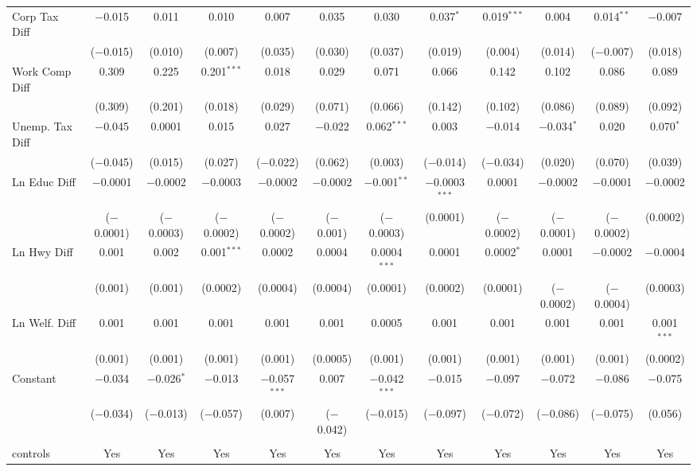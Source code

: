 \documentclass[12pt,a4paper]{article}
\begin{document}
\begin{landscape}
\begin{table}[!htbp]
\begin{tabular}{@{\extracolsep{5pt}}lccccccccccc}
  Corp Tax Diff & $-$0.015 & 0.011 & 0.010 & 0.007 & 0.035 & 0.030 & 0.037$^{*}$ & 0.019$^{***}$ & 0.004 & 0.014$^{**}$ & $-$0.007 \\ 
  & ($-$0.015) & (0.010) & (0.007) & (0.035) & (0.030) & (0.037) & (0.019) & (0.004) & (0.014) & ($-$0.007) & (0.018) \\ 
  Work Comp Diff & 0.309 & 0.225 & 0.201$^{***}$ & 0.018 & 0.029 & 0.071 & 0.066 & 0.142 & 0.102 & 0.086 & 0.089 \\ 
  & (0.309) & (0.201) & (0.018) & (0.029) & (0.071) & (0.066) & (0.142) & (0.102) & (0.086) & (0.089) & (0.092) \\ 
  Unemp. Tax Diff & $-$0.045 & 0.0001 & 0.015 & 0.027 & $-$0.022 & 0.062$^{***}$ & 0.003 & $-$0.014 & $-$0.034$^{*}$ & 0.020 & 0.070$^{*}$ \\ 
  & ($-$0.045) & (0.015) & (0.027) & ($-$0.022) & (0.062) & (0.003) & ($-$0.014) & ($-$0.034) & (0.020) & (0.070) & (0.039) \\ 
  Ln Educ Diff & $-$0.0001 & $-$0.0002 & $-$0.0003 & $-$0.0002 & $-$0.0002 & $-$0.001$^{**}$ & $-$0.0003$^{***}$ & 0.0001 & $-$0.0002 & $-$0.0001 & $-$0.0002 \\ 
  & ($-$0.0001) & ($-$0.0003) & ($-$0.0002) & ($-$0.0002) & ($-$0.001) & ($-$0.0003) & (0.0001) & ($-$0.0002) & ($-$0.0001) & ($-$0.0002) & (0.0002) \\ 
  Ln Hwy Diff & 0.001 & 0.002 & 0.001$^{***}$ & 0.0002 & 0.0004 & 0.0004$^{***}$ & 0.0001 & 0.0002$^{*}$ & 0.0001 & $-$0.0002 & $-$0.0004 \\ 
  & (0.001) & (0.001) & (0.0002) & (0.0004) & (0.0004) & (0.0001) & (0.0002) & (0.0001) & ($-$0.0002) & ($-$0.0004) & (0.0003) \\ 
  Ln Welf. Diff & 0.001 & 0.001 & 0.001 & 0.001 & 0.001 & 0.0005 & 0.001 & 0.001 & 0.001 & 0.001 & 0.001$^{***}$ \\ 
  & (0.001) & (0.001) & (0.001) & (0.001) & (0.0005) & (0.001) & (0.001) & (0.001) & (0.001) & (0.001) & (0.0002) \\ 
  Constant & $-$0.034 & $-$0.026$^{*}$ & $-$0.013 & $-$0.057$^{***}$ & 0.007 & $-$0.042$^{***}$ & $-$0.015 & $-$0.097 & $-$0.072 & $-$0.086 & $-$0.075 \\ 
  & ($-$0.034) & ($-$0.013) & ($-$0.057) & (0.007) & ($-$0.042) & ($-$0.015) & ($-$0.097) & ($-$0.072) & ($-$0.086) & ($-$0.075) & (0.056) \\ 
 \hline \\[-1.8ex] 
controls & Yes & Yes & Yes & Yes & Yes & Yes & Yes & Yes & Yes & Yes & Yes \\ 

\end{tabular}
\end{table}
\end{landscape}
\end{document}
